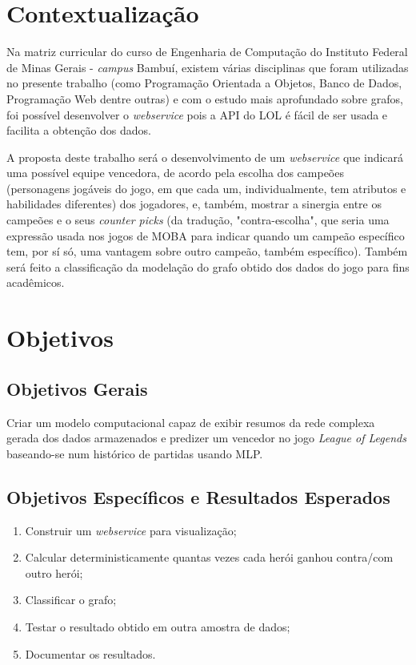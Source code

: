 \section{Contextualização}
Na matriz curricular do curso de Engenharia de Computação do Instituto Federal de Minas Gerais - \textit{campus} Bambuí, existem várias disciplinas que foram utilizadas no presente trabalho (como Programação Orientada a Objetos, Banco de Dados, Programação Web dentre outras) e com o estudo mais aprofundado sobre grafos, foi possível desenvolver o \textit{webservice} pois a API do LOL é fácil de ser usada e facilita a obtenção dos dados.


A proposta deste trabalho será o desenvolvimento de um \textit{webservice} que indicará uma possível equipe vencedora, de acordo pela escolha dos campeões (personagens jogáveis do jogo, em que cada um, individualmente, tem atributos e habilidades diferentes) dos jogadores, e, também, mostrar a sinergia entre os campeões e o seus \textit{counter picks} (da tradução, "contra-escolha", que seria uma expressão usada nos jogos de MOBA para indicar quando um campeão específico tem, por sí só, uma vantagem sobre outro campeão, também específico). Também será feito a classificação da modelação do grafo obtido dos dados do jogo para fins acadêmicos.

\section{Objetivos}
\subsection{Objetivos Gerais}
Criar um modelo computacional capaz de exibir resumos da rede complexa gerada dos dados armazenados e predizer um vencedor no jogo \textit{League of Legends} baseando-se num histórico de partidas usando MLP.

\subsection{Objetivos Específicos e Resultados Esperados}

\begin{enumerate}
\item Construir um \textit{webservice} para visualização;
\item Calcular deterministicamente quantas vezes cada herói ganhou contra/com outro herói;
\item Classificar o grafo;
\item Testar o resultado obtido em outra amostra de dados;
\item Documentar os resultados.

\end{enumerate}

